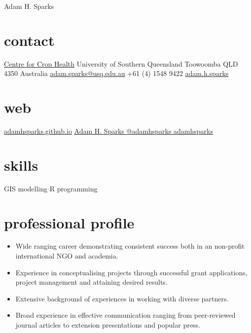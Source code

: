 
\hfill {\Huge Adam H. Sparks}
\begin{aside}
\small{\section{contact}}
\small{\href{http://www.usq.edu.au/research/research-at-usq/institutes-centres/cch}{Centre for Crop Health}}
\small{University of Southern Queensland}
\small{Toowoomba QLD 4350}
\small{Australia}
\small{\href{mailto:adam.sparks@usq.edu.au}{adam.sparks@usq.edu.au}}
\small{+61 (4) 1548 9422 \faMobilePhone{}}
\small{\href{skype:adam.h.sparks?call}{adam.h.sparks }}
\section{web}
\small{\href{https://adamhsparks.github.io}{adamhsparks.github.io}}
\small{\href{https://www.linkedin.com/in/adam-h-sparks-507b968}{Adam H. Sparks {\color{linkedin}\FA {}}}}
\small{\href{https://www.twitter.com/adamhsparks/}{@adamhsparks {\color{twitter.blue}\FA {}}}}
\small{\href{https://github.com/adamhsparks/}{adamhsparks \FA {}}}
\small{\section{skills}}
\small{GIS}
\small{modelling}
\small{R programming}
\end{aside}

\section*{professional profile}

\begin{itemize}
\setlength{\leftmargin}{0pt}
\item Wide ranging career demonstrating consistent success both in an non-profit international NGO and academia.
\item Experience in conceptualising projects through successful grant applications, project management and attaining desired results.
\item Extensive background of experiences in working with diverse partners.
\item Broad experience in effective communication ranging from peer-reviewed journal articles to extension presentations and popular press.
\end{itemize}


